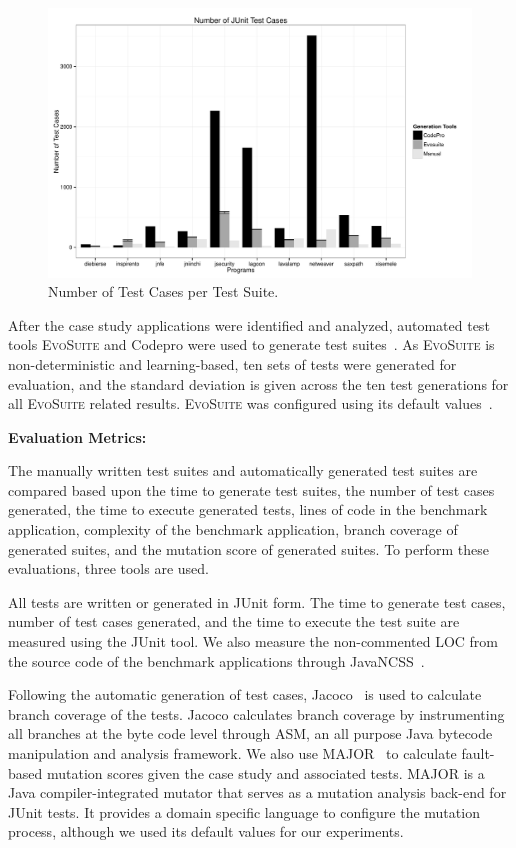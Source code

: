 \begin{figure}[!t]
\centering
  \includegraphics[scale=0.5]{RGraphs/TestCasesGenerated.pdf}
    \caption{Number of Test Cases per Test Suite.}
  \label{fig:NumTests}
\end{figure}

After the case study applications were identified and analyzed, automated test tools \textsc{EvoSuite} and Codepro were used to generate test suites~\cite{CodePro1, fraser:2011:eat:2025113.2025179}. As \textsc{EvoSuite} is non-deterministic and learning-based, ten sets of tests were generated for evaluation, and the standard deviation is given across the ten test generations for all \textsc{EvoSuite} related results.  \textsc{EvoSuite} was configured using its default values~\cite{arcuri2013}.

\noindent \textbf{Evaluation Metrics:}

The manually written test suites and automatically generated test suites are compared based upon the time to generate test suites, the number of test cases generated, the time to execute generated tests, lines of code in the benchmark application, complexity of the benchmark application, branch coverage of generated suites, and the mutation score of generated suites. To perform these evaluations, three tools are used.

All tests are written or generated in JUnit form.  The time to generate test cases, number of test cases generated, and the time to execute the test suite are measured using the JUnit tool.  We also measure the non-commented LOC from the source code of the benchmark applications through JavaNCSS~\cite{leejavancss}.  

Following the automatic generation of test cases, Jacoco~\cite{jacoco} is used to calculate branch coverage of the tests.  Jacoco calculates branch coverage by instrumenting all branches at the byte code level through ASM, an all purpose Java bytecode manipulation and analysis framework. We also use MAJOR~\cite{just2011} to calculate fault-based mutation scores given the case study and associated tests. MAJOR is a Java compiler-integrated mutator that serves as a mutation analysis back-end for JUnit tests.  It provides a domain specific language to configure the mutation process, although we used its default values for our experiments.

